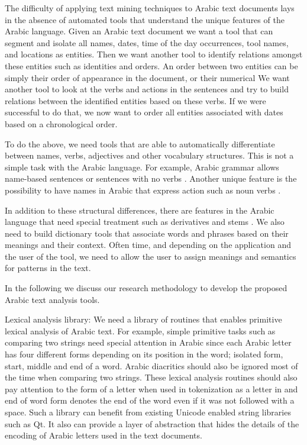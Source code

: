 \documentclass[12pt]{article}
\newcommand{\noTrNoVocRL}[1]{\novocalize\transfalse\RL{#1}\transtrue\vocalize}
\begin{document}
The difficulty of applying text mining techniques to Arabic text 
documents lays in the absence of automated tools that understand 
the unique features of the Arabic language.
Given an Arabic text document we want a tool that can segment 
and isolate all names, dates, time of the day occurrences,
tool names, and locations as entities.
Then we want another tool to identify relations amongst 
these entities such as identities and orders.
An order between two entities can be simply 
their order of appearance in the document, or their
numerical 
 We want another tool to look at the verbs and actions in the sentences and try to build relations between the identified entities based on these verbs.
 If we were successful to do that,
 we now want to order all entities associated with dates based on a chronological order.

To do the above,
 we need tools that are able to automatically differentiate between names,
 verbs,
 adjectives and other vocabulary structures.
 This is not a simple task with the Arabic language.
 For example,
 Arabic grammar allows name-based sentences or sentences with no 
    verbs \noTrNoVocRL{^gml ismiyT} .
 Another unique feature is the possibility to have names in Arabic 
 that express action such as noun verbs 
 \noTrNoVocRL{ism f`l, f-a`l $\ldots$}.

 In addition to these structural differences,
 there are features in the Arabic language that need special 
 treatment such as derivatives and stems 
 \noTrNoVocRL{alm^staq-at w al^g_dwr}.
 We also need to build dictionary tools that associate words and phrases based on their meanings and their context.
 Often time,
 and depending on the application and the user of the tool,
 we need to allow the user to assign meanings and semantics for patterns in the text.

In the following we discuss our research methodology to develop the proposed Arabic text analysis tools.
 
Lexical analysis library: We need a library of routines that enables primitive lexical analysis of Arabic text.
 For example,
 simple primitive tasks such as comparing two strings need special attention in Arabic since each Arabic letter has four different forms depending on its position in the word; isolated form,
 start,
 middle and end of a word.
 Arabic diacritics should also be ignored most of the time when comparing two strings.
 These lexical analysis routines should also pay attention to the form of a letter when used in tokenization as a letter in and end of word form denotes the end of the word even if it was not followed with a space.
 Such a library can benefit from existing Unicode enabled string libraries such as Qt.
 It also can provide a layer of abstraction that hides the details of the encoding of Arabic letters used in the text documents.
 
\end{document}
